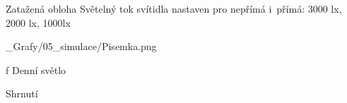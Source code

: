 Zatažená obloha
Světelný tok svítidla nastaven pro nepřímá i~přímá: 3000 lx, 2000 lx, 1000lx

\medskip {}
\picw=10cm _Grafy/05_simulace/Pisemka.png
\caption/f Denní světlo
\medskip




\sec Shrnutí
